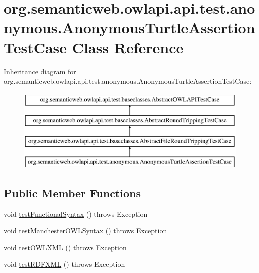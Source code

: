 \hypertarget{classorg_1_1semanticweb_1_1owlapi_1_1api_1_1test_1_1anonymous_1_1_anonymous_turtle_assertion_test_case}{\section{org.\-semanticweb.\-owlapi.\-api.\-test.\-anonymous.\-Anonymous\-Turtle\-Assertion\-Test\-Case Class Reference}
\label{classorg_1_1semanticweb_1_1owlapi_1_1api_1_1test_1_1anonymous_1_1_anonymous_turtle_assertion_test_case}
}
Inheritance diagram for org.\-semanticweb.\-owlapi.\-api.\-test.\-anonymous.\-Anonymous\-Turtle\-Assertion\-Test\-Case\-:\begin{figure}[H]
\begin{center}
\leavevmode
\includegraphics[height=4.000000cm]{classorg_1_1semanticweb_1_1owlapi_1_1api_1_1test_1_1anonymous_1_1_anonymous_turtle_assertion_test_case}
\end{center}
\end{figure}
\subsection*{Public Member Functions}
\begin{DoxyCompactItemize}
\item 
void \hyperlink{classorg_1_1semanticweb_1_1owlapi_1_1api_1_1test_1_1anonymous_1_1_anonymous_turtle_assertion_test_case_a33ff011b92450ce6599fa59827266602}{test\-Functional\-Syntax} ()  throws Exception 
\item 
void \hyperlink{classorg_1_1semanticweb_1_1owlapi_1_1api_1_1test_1_1anonymous_1_1_anonymous_turtle_assertion_test_case_ae1b4b729972a47c7eeb65081f8e39b1c}{test\-Manchester\-O\-W\-L\-Syntax} ()  throws Exception 
\item 
void \hyperlink{classorg_1_1semanticweb_1_1owlapi_1_1api_1_1test_1_1anonymous_1_1_anonymous_turtle_assertion_test_case_a0070e116d51974cd61c8954b61ce6733}{test\-O\-W\-L\-X\-M\-L} ()  throws Exception 
\item 
void \hyperlink{classorg_1_1semanticweb_1_1owlapi_1_1api_1_1test_1_1anonymous_1_1_anonymous_turtle_assertion_test_case_a06adb4ec2deacfb314d2c327759b4a64}{test\-R\-D\-F\-X\-M\-L} ()  throws Exception 
\end{DoxyCompactItemize}
